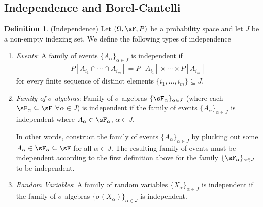 \documentclass[12pt]{article}
\theoremstyle{plain}
\theoremstyle{definition}
\newtheorem{defn}[thm]{Definition}
\theoremstyle{remark}
\begin{document}
\subsection{Independence and Borel-Cantelli}

\begin{defn}(Independence)
Let $(\Omega,\sF,P)$ be a probability space and let $J$ be a non-empty
indexing set. We define the following types of independence
\begin{enumerate}
  \item \emph{Events}: A family of events $\{A_\alpha\}_{\alpha\in J}$
    is independent if
    \begin{align*}
      P[A_{i_1} \cap \cdots \cap A_{i_m}]
      = P[A_{i_1}]\times \cdots \times P[A_{i_m}]
    \end{align*}
    for every finite sequence of distinct elements
    $\{i_1,\ldots,i_m\}\subseteq J$.

  \item \emph{Family of $\sigma$-algebras}: Family of
    $\sigma$-algebras $\{\sF_\alpha\}_{\alpha\in J}$
    (where each $\sF_\alpha\subseteq \sF$ $\forall\alpha\in J$)
    is independent if the family of events
    $\{A_\alpha\}_{\alpha \in J}$ is independent where
    $A_{\alpha}\in \sF_{\alpha}$, $\alpha\in J$.

    In other words, construct the family of events
    $\{A_\alpha\}_{\alpha \in J}$ by plucking out some
    $A_\alpha \in \sF_\alpha\subseteq \sF$ for all $\alpha \in J$. The
    resulting family of events must be independent according to the
    first definition above for the family
    $\{\sF_\alpha\}_{\alpha \in J}$ to be independent.

  \item \emph{Random Variables}: A family of random variables
    $\{X_\alpha\}_{\alpha\in J}$ is independent if
    the family of $\sigma$-algebras
    $\{\sigma(X_\alpha)\}_{\alpha \in J}$ is independent.
\end{enumerate}
\end{defn}
\end{document}
